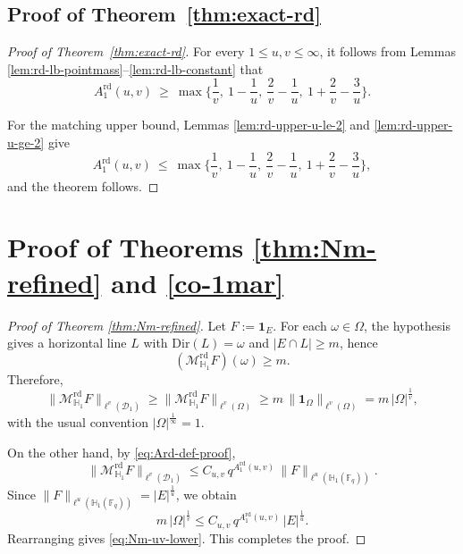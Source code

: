 \documentclass[11pt]{article}
\newtheorem{corollary}[theorem]{Corollary}
\newcommand{\1}{\mathbf 1}
\begin{document}





\subsection{Proof of Theorem~\ref{thm:exact-rd}}

\begin{proof} [Proof of Theorem~\ref{thm:exact-rd}]
For every $1\le u,v\le\infty$, it follows from Lemmas
\ref{lem:rd-lb-pointmass}--\ref{lem:rd-lb-constant} that
\[
A^{\mathrm{rd}}_1(u,v)\ \ge\
\max\Bigg\{\frac1v,\ 1-\frac1u,\ \frac{2}{v}-\frac1u,\ 1+\frac{2}{v}-\frac{3}{u}\Bigg\}.
\]

\medskip



For the matching upper bound, Lemmas
\ref{lem:rd-upper-u-le-2} and \ref{lem:rd-upper-u-ge-2} give
\[
A^{\mathrm{rd}}_1(u,v)\ \le\
\max\Bigg\{\frac1v,\ 1-\frac1u,\ \frac{2}{v}-\frac1u,\ 1+\frac{2}{v}-\frac{3}{u}\Bigg\},
\]
and the theorem follows. 
\end{proof}





\section{Proof of Theorems \ref{thm:Nm-refined} and \ref{co-1mar}}\label{section10}



\begin{proof}[Proof of Theorem \ref{thm:Nm-refined}]
Let $F:=\mathbf 1_E$. For each $\omega\in\Omega$, the hypothesis gives a horizontal line $L$
with $\mathrm{Dir}(L)=\omega$ and $|E\cap L|\ge m$, hence
\[
(\mathcal{M}^{\mathrm{rd}}_{\mathbb H_1}F)(\omega)\ge m.
\]
Therefore,
\[
\|\mathcal{M}^{\mathrm{rd}}_{\mathbb H_1}F\|_{\ell^v(\mathcal D_1)}
\ge
\|\mathcal{M}^{\mathrm{rd}}_{\mathbb H_1}F\|_{\ell^v(\Omega)}
\ge
m\,\|\mathbf 1_\Omega\|_{\ell^v(\Omega)}
=
m\,|\Omega|^{\frac{1}{v}},
\]
with the usual convention $|\Omega|^{ \frac{1}{\infty}}=1$.

On the other hand, by \eqref{eq:Ard-def-proof},
\[
\|\mathcal{M}^{\mathrm{rd}}_{\mathbb H_1}F\|_{\ell^v(\mathcal D_1)}
\le
C_{u,v}\,q^{A^{\mathrm{rd}}_1(u,v)}\,
\|F\|_{\ell^u(\mathbb H_1(\mathbb F_q))}.
\]
Since $\|F\|_{\ell^u(\mathbb H_1(\mathbb F_q))}=|E|^{\frac{1}{u}}$, we obtain
\[
m\,|\Omega|^{\frac{1}{v}}
\le
C_{u,v}\,q^{A^{\mathrm{rd}}_1(u,v)}\,|E|^{\frac{1}{u}}.
\]
Rearranging gives \eqref{eq:Nm-uv-lower}. This completes the proof.
\end{proof}
\end{document}
